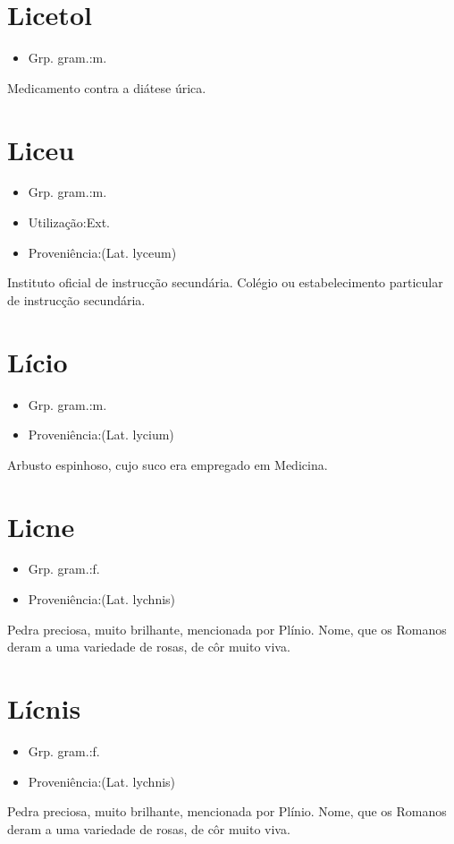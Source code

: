 \section{Licetol}
\begin{itemize}
\item {Grp. gram.:m.}
\end{itemize}
Medicamento contra a diátese úrica.
\section{Liceu}
\begin{itemize}
\item {Grp. gram.:m.}
\end{itemize}
\begin{itemize}
\item {Utilização:Ext.}
\end{itemize}
\begin{itemize}
\item {Proveniência:(Lat. \textunderscore lyceum\textunderscore )}
\end{itemize}
Instituto oficial de instrucção secundária.
Colégio ou estabelecimento particular de instrucção secundária.
\section{Lício}
\begin{itemize}
\item {Grp. gram.:m.}
\end{itemize}
\begin{itemize}
\item {Proveniência:(Lat. \textunderscore lycium\textunderscore )}
\end{itemize}
Arbusto espinhoso, cujo suco era empregado em Medicina.
\section{Licne}
\begin{itemize}
\item {Grp. gram.:f.}
\end{itemize}
\begin{itemize}
\item {Proveniência:(Lat. \textunderscore lychnis\textunderscore )}
\end{itemize}
Pedra preciosa, muito brilhante, mencionada por Plínio.
Nome, que os Romanos deram a uma variedade de rosas, de côr muito viva.
\section{Lícnis}
\begin{itemize}
\item {Grp. gram.:f.}
\end{itemize}
\begin{itemize}
\item {Proveniência:(Lat. \textunderscore lychnis\textunderscore )}
\end{itemize}
Pedra preciosa, muito brilhante, mencionada por Plínio.
Nome, que os Romanos deram a uma variedade de rosas, de côr muito viva.
